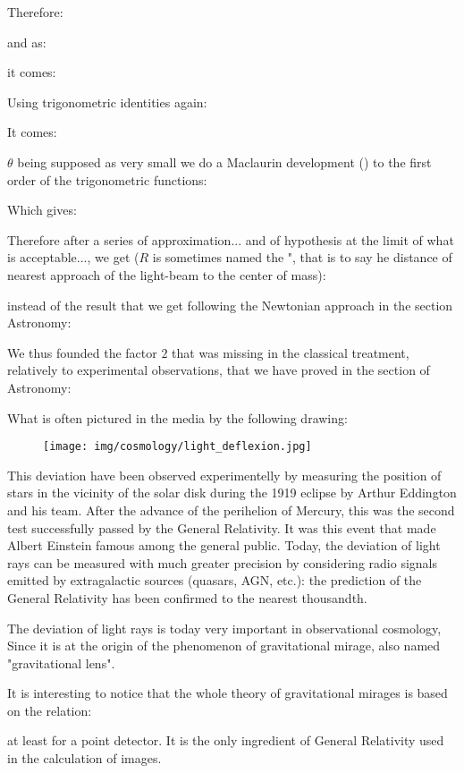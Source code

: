 	Therefore:
	
	and as:
	
	it comes:
	
	Using trigonometric identities again:
	
	It comes:
	
	$\theta$ being supposed as very small we do a Maclaurin development () to the first order of the trigonometric functions:
	
	Which gives:
	
	Therefore after a series of approximation... and of hypothesis at the limit of what is acceptable..., we get ($R$ is sometimes named the ", that is to say he distance of nearest approach of the light-beam to the center of mass):
	
	instead of the result that we get following the Newtonian approach in the section Astronomy:
	
	We thus founded the factor $2$ that was missing in the classical treatment, relatively to experimental observations, that we have proved in the section of Astronomy:
	
	What is often pictured in the media by the following drawing:
	\begin{figure}[H]
		\centering
		\texttt{[image: img/cosmology/light\_deflexion.jpg]}	
	\end{figure}
	This deviation have been observed experimentelly by measuring the position of stars in the vicinity of the solar disk during the 1919 eclipse by Arthur Eddington and his team. After the advance of the perihelion of Mercury, this was the second test successfully passed by the General Relativity. It was this event that made Albert Einstein famous among the general public. Today, the deviation of light rays can be measured with much greater precision by considering radio signals emitted by extragalactic sources (quasars, AGN, etc.): the prediction of the General Relativity has been confirmed to the nearest thousandth.

	The deviation of light rays is today very important in observational cosmology,
Since it is at the origin of the phenomenon of gravitational mirage, also named "gravitational lens".

	It is interesting to notice that the whole theory of gravitational mirages is based on the relation:
	
	at least for a point detector. It is the only ingredient of General Relativity used in the calculation of images.
	
